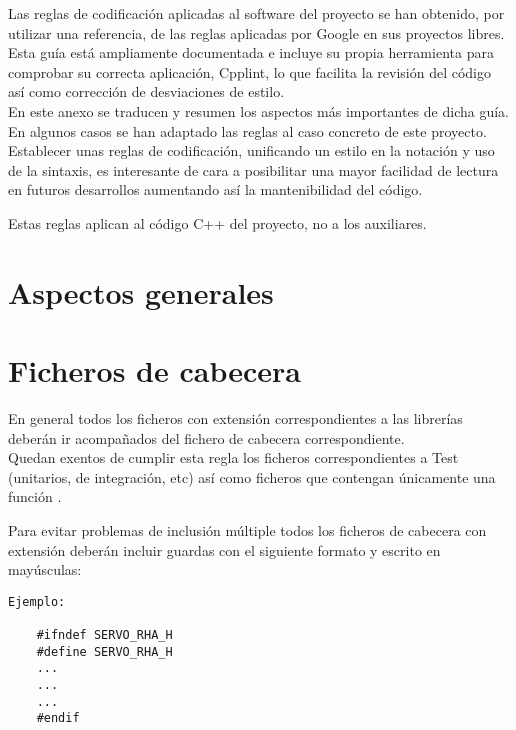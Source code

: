 Las reglas de codificación aplicadas al software del proyecto se han obtenido, por utilizar una referencia, de las reglas aplicadas por Google en sus proyectos libres. Esta guía está ampliamente documentada e incluye su propia herramienta para comprobar su correcta aplicación, Cpplint, lo que facilita la revisión del código así como corrección de desviaciones de estilo.
\\

En este anexo se traducen y resumen los aspectos más importantes de dicha guía. En algunos casos se han adaptado las reglas al caso concreto de este proyecto.
\\

Establecer unas reglas de codificación, unificando un estilo en la notación y uso de la sintaxis, es interesante de cara a posibilitar una mayor facilidad de lectura en futuros desarrollos aumentando así la mantenibilidad del código.

Estas reglas aplican al código C++ del proyecto, no a los  auxiliares.

\section{Aspectos generales} \label{sec:codificacionSW:general}

\section{Ficheros de cabecera} \label{sec:codificacionSW:cabeceras}

    En general todos los ficheros con extensión  correspondientes a las librerías deberán ir acompañados del fichero de cabecera  correspondiente.
    \\
    
    Quedan exentos de cumplir esta regla los ficheros correspondientes a Test (unitarios, de integración, etc) así como ficheros que contengan únicamente una función .


    Para evitar problemas de inclusión múltiple todos los ficheros de cabecera con extensión  deberán incluir guardas con el siguiente formato y escrito en mayúsculas:  
    \\ 
    
    \lstset{language=C, breaklines=true, basicstyle=\footnotesize}
    \begin{lstlisting}[frame=single]
Ejemplo:

    #ifndef SERVO_RHA_H
    #define SERVO_RHA_H
    ...
    ...
    ...
    #endif
    \end{lstlisting}
    
